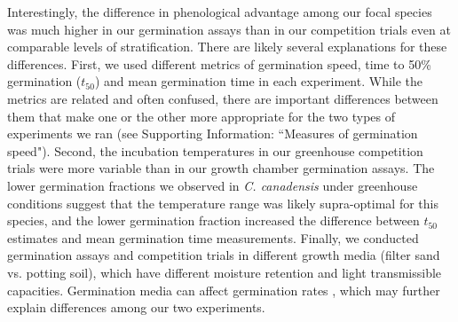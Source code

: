 \documentclass{article}[11pt]
\begin{document}
Interestingly, the difference in phenological advantage among our focal species was much higher in our germination assays than in our competition trials even at comparable levels of stratification. There are likely several explanations for these differences. First, we used different metrics of germination speed, time to 50\% germination ($t_{50}$) and mean germination time in each experiment. While the metrics are related and often confused, there are important differences between them that make one or the other more appropriate for the two types of experiments we ran (see Supporting Information: ``Measures of germination speed"). Second, the incubation temperatures in our greenhouse competition trials were more variable than in our growth chamber germination assays. The lower germination fractions we observed in \textit{C. canadensis} under greenhouse conditions suggest that the temperature range was likely supra-optimal for this species, and the lower germination fraction increased the difference between $t_{50}$ estimates and mean germination time measurements. Finally, we  conducted germination assays and competition trials in different growth media (filter sand vs. potting soil), which have different moisture retention and light transmissible capacities. Germination media can affect germination rates \citep{Baskin2014}, which may further explain differences among our two experiments.
\end{document}
